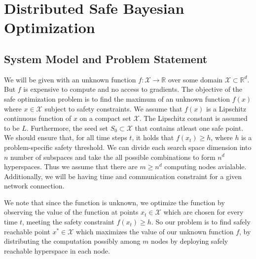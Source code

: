 \chapter{Distributed Safe Bayesian Optimization}
\label{ch:distbo}

\section{System Model and Problem Statement}
We will be given with an unknown function $f: \mathcal{X} \to \mathbb{R}$ over some domain $\mathcal{X} \subset \mathbb{R}^d$. But $f$ is expensive to compute and no access to gradients.
The objective of the safe optimization problem is to find the maximum of an unknown function $f(x)$ where $x \in \mathcal{X}$ subject to safety constraints. 
We assume that $f(x)$ is a Lipschitz continuous function of $x$ on a compact set $\mathcal{X}$. The Lipschitz constant is assumed to be $L$.
Furthermore, the seed set $S_0 \subset \mathcal{X}$ that contains atleast one safe point. 
We should ensure that, for all time steps $t$, it holds that $f(x_t) \geq h$, where $h$ is a problem-specific safety threshold.
We can divide each search space dimension into $n$ number of subspaces and take the all possible combinations to form $n^d$ hyperspaces. Thus we assume that there are $m \ge n^d$ computing nodes avialable. 
Additionally, we will be having time and communication constraint for a given network connection.

We note that since the function is unknown, we optimize the function by observing the value of the function at points $x_t \in \mathcal{X}$ which are chosen for every time $t$, meeting the safety constraint $f(x_t) \geq h$.
So our problem is to find safely reachable point $x^* \in \mathcal{X}$ which maximizes the value of our unknown function $f$, by distributing the computation possibly among $m$ nodes by deploying safely reachable hyperspace in each node.

